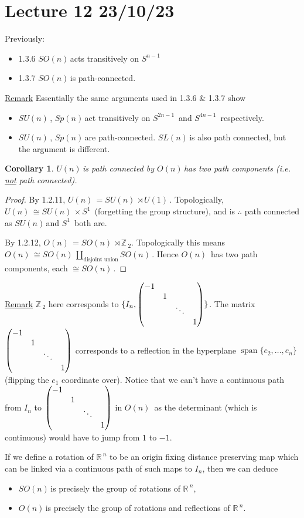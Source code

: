 \documentclass[12pt,a4paper]{article}
\newcommand{\zZ}{\ensuremath{\mathbb{Z}\,}}
\newcommand{\rR}{\ensuremath{\mathbb{R}\,}}
\newcommand{\gon}{\ensuremath{O(n)\,}}
\newcommand{\gun}{\ensuremath{U(n)\,}}
\newcommand{\gspn}{\ensuremath{Sp(n)\,}}
\newcommand{\guk}[1]{\ensuremath{U(#1)\,}}
\newcommand{\gson}{\ensuremath{SO(n)\,}}
\newcommand{\gsun}{\ensuremath{SU(n)\,}}
\newcommand{\gsln}{\ensuremath{SL(n)\,}}
\newcommand{\sph}[1]{\ensuremath{S^{#1}}\,}
\newcommand{\ul}[1]{\underline{#1}}
\newtheorem{cor}[thm]{Corollary}
\begin{document}
\section{Lecture 12 23/10/23}

Previously: 
\begin{itemize}
\item 1.3.6 \gson acts transitively on \sph{n-1}
\item 1.3.7 \gson is path-connected. 
\end{itemize}

\ul{Remark} Essentially the same arguments used in 1.3.6 \& 1.3.7 show

\begin{itemize}
\item \gsun, \gspn act transitively on \sph{2n-1} and \sph{4n-1} respectively.
\item \gsun , \gspn are path-connected. \gsln is also path connected, but the argument is different.
\end{itemize}

\begin{cor}
\gun is path connected by \gon has two path components (i.e. \ul{not} path connected).
\end{cor}

\begin{proof}
By 1.2.11, $\gun=\gsun \rtimes \guk{1}$. Topologically, $\gun \cong \gsun \times \sph{1}$ (forgetting the group structure), and is $\therefore$ path connected as \gsun and \sph{1} both are.

By 1.2.12, $\gon=\gson \rtimes \zZ_2$. Topologically this means $\gon \cong \gson \underset{\text{disjoint union}}{\amalg} \gson$. Hence $\gon$ has two path components, each $\cong \gson$. 
\end{proof}

\ul{Remark} $\zZ_2$ here corresponds to $\{I_n, \pmqty{\dmat{-1,1,\ddots,1}}\}$. The matrix $\pmqty{\dmat{-1,1,\ddots,1}}$ corresponds to a reflection in the hyperplane $\operatorname{span}\{e_2,\ldots,e_n\}$ (flipping the $e_1$ coordinate over). Notice that we can't have a continuous path from $I_n$ to $\pmqty{\dmat{-1,1,\ddots,1}}$ in $\gon$ as the determinant (which is continuous) would have to jump from $1$ to $-1$.

If we define a rotation of $\rR^n$ to be an origin fixing distance preserving map which can be linked via a continuous path of such maps to $I_n$, then we can deduce
\begin{itemize}
\item \gson is precisely the group of rotations of $\rR^n$,
\item \gon is precisely the group of rotations and reflections of $\rR^n$.
\end{itemize}
\end{document}
